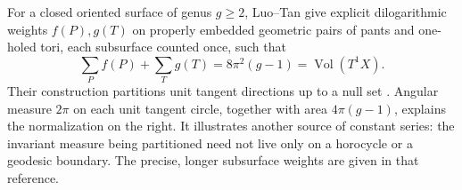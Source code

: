 For a closed oriented surface of genus $g\ge2$, Luo--Tan give explicit
dilogarithmic weights $f(P),g(T)$ on properly embedded geometric pairs of
pants and one-holed tori, each subsurface counted once,
such that
\begin{equation}
 \sum_P f(P)+\sum_T g(T)=8\pi^2(g-1)=\operatorname{Vol}(T^1X).
 \label{eq:luotan}
\end{equation}
Their construction partitions unit tangent directions up to a null set
\cite[Theorem 1.1 and Section 1.2]{LuoTan}. Angular measure $2\pi$ on
each unit tangent circle, together with area $4\pi(g-1)$, explains the
normalization on the right.
It illustrates another source of constant series: the invariant measure
being partitioned need not live only on a horocycle or a geodesic boundary.
The precise, longer subsurface weights are given in that reference.
